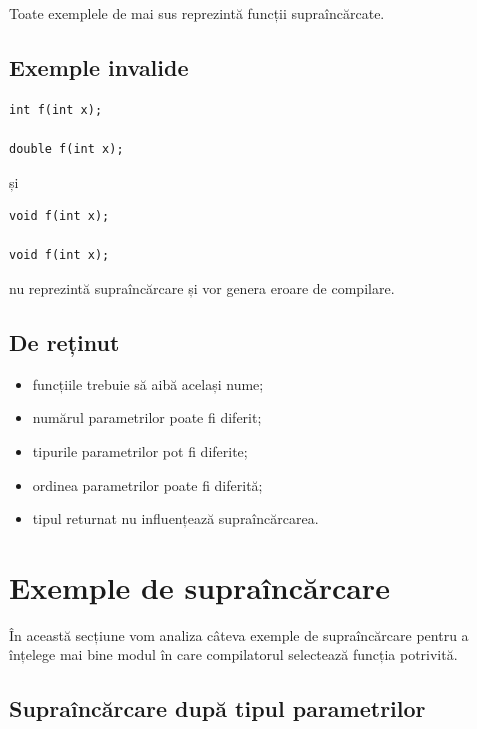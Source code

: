 \documentclass[12pt,a4paper]{article}
\begin{document}
Toate exemplele de mai sus reprezintă funcții supraîncărcate.

\subsection{Exemple invalide}

\begin{verbatim}
int f(int x);

double f(int x);
\end{verbatim}

și

\begin{verbatim}
void f(int x);

void f(int x);
\end{verbatim}

nu reprezintă supraîncărcare și vor genera eroare de compilare.

\subsection{De reținut}

\begin{itemize}
\item funcțiile trebuie să aibă același nume;
\item numărul parametrilor poate fi diferit;
\item tipurile parametrilor pot fi diferite;
\item ordinea parametrilor poate fi diferită;
\item tipul returnat nu influențează supraîncărcarea.
\end{itemize}







\newpage

\section{Exemple de supraîncărcare}

În această secțiune vom analiza câteva exemple de supraîncărcare pentru a înțelege mai bine modul în care compilatorul selectează funcția potrivită.

\subsection{Supraîncărcare după tipul parametrilor}
\end{document}
